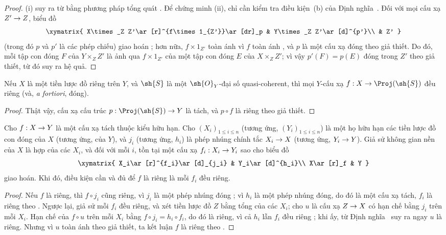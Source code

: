 \documentclass[oneside,10pt]{amsart}
\makeatletter
\renewcommand{\leq}{\leqslant}
\newcommand{\ega@arrow}[2]{\mathchoice{#1}{#2}{#2}{#2}}
\renewcommand{\to}{\ega@arrow{\longrightarrow}{\rightarrow}}
\newcommand{\oldpage}[2][]{\marginnote{\normalfont\footnotesize\textbf{#1}~|~#2}\ignorespaces}
\let\EGAOriginalLabel\label
\renewcommand{\label}[1]{\phantomsection\EGAOriginalLabel{#1}}
\makeatother
\begin{document}
\begin{proof}
(i) suy ra từ  bằng phương pháp tổng quát .
Để chứng minh (ii), chỉ cần kiểm tra điều kiện~(b) của Định nghĩa~.
Đối với mọi cấu xạ $Z'\to Z$, biểu đồ
\[
  \xymatrix{
    X\times_Z Z'\ar[r]^{f\times1_{Z'}}\ar[dr]_p &
    Y\times_Z Z'\ar[d]^{p'}\\
    & Z'
  }
\]
(trong đó $p$ và $p'$ là các phép chiếu) giao hoán ;
hơn nữa, $f\times1_{Z'}$ toàn ánh vì $f$ toàn ánh , và $p$ là một cấu xạ đóng theo giả thiết.
Do đó, mỗi tập con đóng $F$ của $Y\times_Z Z'$ là ảnh qua $f\times1_{Z'}$ của một tập con đóng $E$ của $X\times_Z Z'$; vì vậy $p'(F)=p(E)$ đóng trong $Z'$ theo giả thiết, từ đó suy ra hệ quả.
\end{proof}

\begin{corollary}[5.4.4]
\label{II.5.4.4}
Nếu $X$ là một tiền lược đồ riêng trên $Y$, và $\sh{S}$ là một $\sh{O}_Y$-đại số quasi-coherent, thì mọi $Y$-cấu xạ $f:X\to\Proj(\sh{S})$ đều riêng (và, \emph{a fortiori}, đóng).
\end{corollary}

\begin{proof}
Thật vậy, cấu xạ cấu trúc $p:\Proj(\sh{S})\to Y$ là tách, và $p\circ f$ là riêng theo giả thiết.
\end{proof}

\begin{corollary}[5.4.5]
\label{II.5.4.5}
Cho $f:X\to Y$ là một cấu xạ tách thuộc kiểu hữu hạn.
Cho $(X_i)_{1\leq i\leq n}$ (tương ứng, $(Y_i)_{1\leq i\leq n}$) là một họ hữu hạn các tiền lược đồ con đóng của $X$ (tương ứng, của $Y$), và $j_i$ (tương ứng, $h_i$) là phép nhúng chính tắc $X_i\to X$ (tương ứng, $Y_i\to Y$).
Giả sử không gian nền của $X$ là hợp của các $X_i$, và đối với mỗi $i$, tồn tại một cấu xạ $f_i:X_i\to Y_i$ sao cho biểu đồ
\[
  \xymatrix{
    X_i\ar[r]^{f_i}\ar[d]_{j_i} &
    Y_i\ar[d]^{h_i}\\
    X\ar[r]_f &
    Y
  }
\]
giao hoán.
Khi đó, điều kiện cần và đủ để $f$ là riêng là mỗi $f_i$ đều riêng.
\end{corollary}
\oldpage[II]{102}
\begin{proof}
Nếu $f$ là riêng, thì $f\circ j_i$ cũng riêng, vì $j_i$ là một phép nhúng đóng ;
vì $h_i$ là một phép nhúng đóng, do đó là một cấu xạ tách, $f_i$ là riêng theo .
Ngược lại, giả sử mỗi $f_i$ đều riêng, và xét tiền lược đồ $Z$ bằng tổng của các $X_i$; cho $u$ là cấu xạ $Z\to X$ có hạn chế bằng $j_i$ trên mỗi $X_i$.
Hạn chế của $f\circ u$ trên mỗi $X_i$ bằng $f\circ j_i=h_i\circ f_i$, do đó là riêng, vì cả $h_i$ lẫn $f_i$ đều riêng ;
khi ấy, từ Định nghĩa~ suy ra ngay $u$ là riêng.
Nhưng vì $u$ toàn ánh theo giả thiết, ta kết luận $f$ là riêng theo .
\end{proof}
\end{document}
